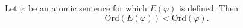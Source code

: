 Let $\varphi$ be an atomic sentence for which $E(\varphi)$ is defined. Then
$$\text{Ord}(E(\varphi)) < \text{Ord}(\varphi).$$
